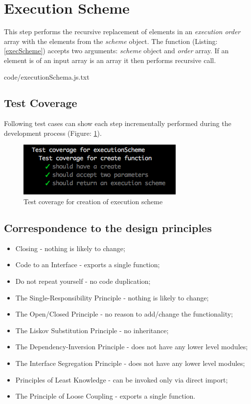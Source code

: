 \section{Execution Scheme}
\label{sec:execScheme}
This step performs the recursive replacement of elements in an \textit{execution order} array with the elements from the \textit{scheme} object. The function (Listing: \ref{execScheme}) accepts two arguments: \textit{scheme} object and \textit{order} array. If an element is of an input array is an array it then performs recursive call.


{code/executionSchema.js.txt}
\subsection{Test Coverage}
Following test cases can show each step incrementally performed during the development process (Figure: \ref{fig:testCreate}).
\begin{figure}[H]
	\centering
	\includegraphics[width=\linewidth]{grafiken/testCreate.png}
	\caption{Test coverage for creation of execution scheme}
	\label{fig:testCreate}
\end{figure}

\subsection{Correspondence to the design principles}
\begin{itemize}
	\item Closing - nothing is likely to change;
	\item Code to an Interface - exports a single function;
	\item Do not repeat yourself - no code duplication;
	\item The Single-Responsibility Principle - nothing is likely to change;
	\item The Open/Closed Principle - no reason to add/change the functionality;
	\item The Liskov Substitution Principle - no inheritance;
	\item The Dependency-Inversion Principle - does not have any lower level modules;
	\item The Interface Segregation Principle - does not have any lower level modules;
	\item Principles of Least Knowledge -  can be invoked only via direct import;
	\item The Principle of Loose Coupling - exports a single function.
\end{itemize}

